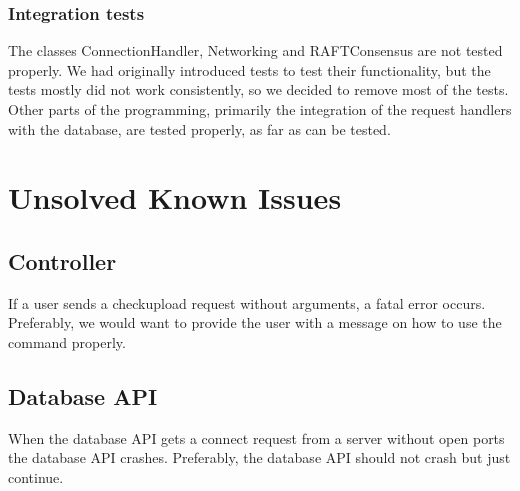 \documentclass[./Main.tex]{subfiles}
\begin{document}
\tocless\subsubsection{Integration tests}
The classes ConnectionHandler, Networking and RAFTConsensus are not tested properly. We had originally introduced tests to test their functionality, but the tests mostly did not work consistently, so we decided to remove most of the tests. Other parts of the programming, primarily the integration of the request handlers with the database, are tested properly, as far as can be tested.

\section{Unsolved Known Issues}
\subsection{Controller}
If a user sends a checkupload request without arguments, a fatal error occurs. Preferably, we would want to provide the user with a message on how to use the command properly.

\subsection{Database API}

When the database API gets a connect request from a server without open ports the database API crashes. Preferably, the database API should not crash but just continue.
\end{document}
